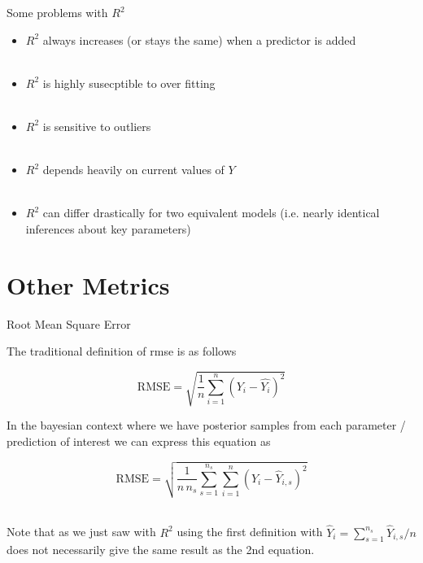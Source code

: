 \documentclass[11pt,ignorenonframetext,]{beamer}
\begin{document}
\begin{frame}{Some problems with \(R^2\)}

\begin{itemize}
\item $R^2$ always increases (or stays the same) when a predictor is added  \\ ~\\
\item $R^2$ is highly susecptible to over fitting \\ ~\\
\item $R^2$ is sensitive to outliers \\ ~\\
\item $R^2$ depends heavily on current values of $Y$ \\ ~\\
\item $R^2$ can differ drastically for two equivalent models (i.e. nearly identical inferences about key parameters)
\end{itemize}

\end{frame}

\section{Other Metrics}\label{other-metrics}

\begin{frame}{Root Mean Square Error}

The traditional definition of rmse is as follows

\[ \text{RMSE} = \sqrt{ \frac{1}{n} \sum_{i=1}^n \left(Y_i - \hat{Y_i} \right)^2 } \]

In the bayesian context where we have posterior samples from each
parameter / prediction of interest we can express this equation as

\[ \text{RMSE} = \sqrt{ \frac{1}{n \, n_s} \sum_{s=1}^{n_s} \sum_{i=1}^n \left(Y_i - \hat{Y}_{i,s} \right)^2 } \]
\(~\)

Note that as we just saw with \(R^2\) using the first definition with
\(\hat{Y}_{i} = \sum_{s=1}^{n_s}\hat{Y}_{i,s} / n\) does not necessarily
give the same result as the 2nd equation.

\end{frame}
\end{document}
